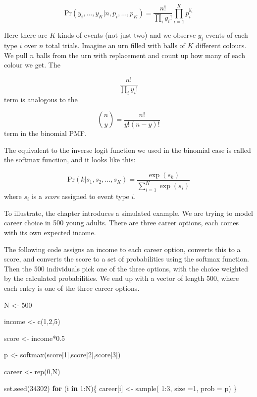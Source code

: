 \documentclass[
]{book}
\newenvironment{Shaded}{\begin{snugshade}}{\end{snugshade}}
\newcommand{\AttributeTok}[1]{\textcolor[rgb]{0.77,0.63,0.00}{#1}}
\newcommand{\ControlFlowTok}[1]{\textcolor[rgb]{0.13,0.29,0.53}{\textbf{#1}}}
\newcommand{\DecValTok}[1]{\textcolor[rgb]{0.00,0.00,0.81}{#1}}
\newcommand{\FloatTok}[1]{\textcolor[rgb]{0.00,0.00,0.81}{#1}}
\newcommand{\FunctionTok}[1]{\textcolor[rgb]{0.00,0.00,0.00}{#1}}
\newcommand{\NormalTok}[1]{#1}
\newcommand{\OtherTok}[1]{\textcolor[rgb]{0.56,0.35,0.01}{#1}}
\newcommand{\SpecialCharTok}[1]{\textcolor[rgb]{0.00,0.00,0.00}{#1}}
\begin{document}
\[
\text{Pr}(y_i, \dots , y_K | n, p_i, \dots , p_K) = \frac{n!}{\prod_i y_i!} \prod^K_{i=1}p_i^{y_i}
\]

Here there are \(K\) kinds of events (not just two) and we observe \(y_i\) events of each type \(i\) over \(n\) total trials. Imagine an urn filled with balls of \(K\) different colours. We pull \(n\) balls from the urn with replacement and count up how many of each colour we get. The

\[
\frac{n!}{\prod_i y_i!}
\]
term is analogous to the

\[
{n \choose y} = \frac{n!}{y! (n-y)!}
\]
term in the binomial PMF.

The equivalent to the inverse logit function we used in the binomial case is called the softmax function, and it looks like this:

\[
\text{Pr}(k| s_1, s_2, \dots, s_K) = \frac{\exp(s_k)}{\sum^K_{i=1} \exp(s_i)}
\]
where \(s_i\) is a \emph{score} assigned to event type \(i\).

To illustrate, the chapter introduces a simulated example. We are trying to model career choice in 500 young adults. There are three career options, each comes with its own expected income.

The following code assigns an income to each career option, converts this to a score, and converts the score to a set of probabilities using the softmax function. Then the 500 individuals pick one of the three options, with the choice weighted by the calculated probabilities. We end up with a vector of length 500, where each entry is one of the three career options.

\begin{Shaded}
\begin{Highlighting}[]
\NormalTok{N }\OtherTok{\textless{}{-}} \DecValTok{500}

\NormalTok{income }\OtherTok{\textless{}{-}} \FunctionTok{c}\NormalTok{(}\DecValTok{1}\NormalTok{,}\DecValTok{2}\NormalTok{,}\DecValTok{5}\NormalTok{)}

\NormalTok{score }\OtherTok{\textless{}{-}}\NormalTok{ income}\SpecialCharTok{*}\FloatTok{0.5}

\NormalTok{p }\OtherTok{\textless{}{-}} \FunctionTok{softmax}\NormalTok{(score[}\DecValTok{1}\NormalTok{],score[}\DecValTok{2}\NormalTok{],score[}\DecValTok{3}\NormalTok{])}


\NormalTok{career }\OtherTok{\textless{}{-}} \FunctionTok{rep}\NormalTok{(}\DecValTok{0}\NormalTok{,N)}

\FunctionTok{set.seed}\NormalTok{(}\DecValTok{34302}\NormalTok{)}
\ControlFlowTok{for}\NormalTok{ (i }\ControlFlowTok{in} \DecValTok{1}\SpecialCharTok{:}\NormalTok{N)\{}
\NormalTok{  career[i] }\OtherTok{\textless{}{-}} \FunctionTok{sample}\NormalTok{( }\DecValTok{1}\SpecialCharTok{:}\DecValTok{3}\NormalTok{, }\AttributeTok{size =}\DecValTok{1}\NormalTok{, }\AttributeTok{prob =}\NormalTok{ p)}
\NormalTok{\}}
\end{Highlighting}
\end{Shaded}
\end{document}

